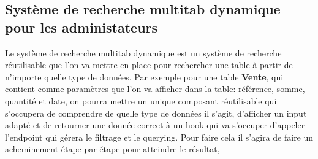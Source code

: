 \documentclass[../main.tex]{subfiles}
\begin{document}
\subsection{Système de recherche multitab dynamique pour les administateurs}
Le système de recherche multitab dynamique est un système de recherche réutilisable que l'on va mettre en place pour rechercher une table à partir de n'importe quelle type de données. 
Par exemple pour une table \textbf{Vente}, qui contient comme paramètres que l'on va afficher dans la table: référence, somme, quantité et date, on pourra mettre un unique composant réutilisable qui s'occupera de comprendre de quelle type de données il s'agit, d'afficher un input adapté et de retourner une donnée correct à un hook qui va s'occuper d'appeler l'endpoint qui gérera le filtrage et le querying. 
Pour faire cela il s'agira de faire un acheminement étape par étape pour atteindre le résultat, 
\end{document}

